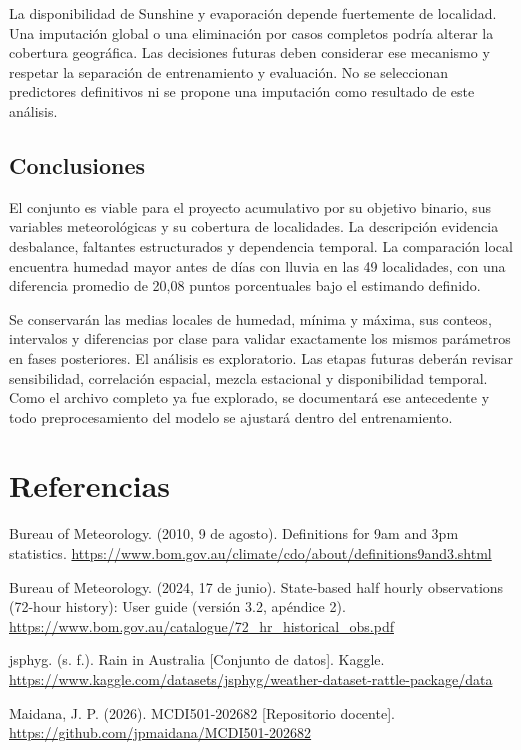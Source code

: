 \documentclass[11pt,a4paper]{article}
\begin{document}
La disponibilidad de Sunshine y evaporación depende fuertemente de localidad. Una imputación global o una eliminación por casos completos podría alterar la cobertura geográfica. Las decisiones futuras deben considerar ese mecanismo y respetar la separación de entrenamiento y evaluación. No se seleccionan predictores definitivos ni se propone una imputación como resultado de este análisis.


\subsection{Conclusiones}

El conjunto es viable para el proyecto acumulativo por su objetivo binario, sus variables meteorológicas y su cobertura de localidades. La descripción evidencia desbalance, faltantes estructurados y dependencia temporal. La comparación local encuentra humedad mayor antes de días con lluvia en las 49 localidades, con una diferencia promedio de 20,08 puntos porcentuales bajo el estimando definido.


Se conservarán las medias locales de humedad, mínima y máxima, sus conteos, intervalos y diferencias por clase para validar exactamente los mismos parámetros en fases posteriores. El análisis es exploratorio. Las etapas futuras deberán revisar sensibilidad, correlación espacial, mezcla estacional y disponibilidad temporal. Como el archivo completo ya fue explorado, se documentará ese antecedente y todo preprocesamiento del modelo se ajustará dentro del entrenamiento.


\clearpage


\section{Referencias}

Bureau of Meteorology. (2010, 9 de agosto). Definitions for 9am and 3pm statistics. \url{https://www.bom.gov.au/climate/cdo/about/definitions9and3.shtml}


Bureau of Meteorology. (2024, 17 de junio). State-based half hourly observations (72-hour history): User guide (versión 3.2, apéndice 2). \url{https://www.bom.gov.au/catalogue/72_hr_historical_obs.pdf}


jsphyg. (s. f.). Rain in Australia [Conjunto de datos]. Kaggle. \url{https://www.kaggle.com/datasets/jsphyg/weather-dataset-rattle-package/data}


Maidana, J. P. (2026). MCDI501-202682 [Repositorio docente]. \url{https://github.com/jpmaidana/MCDI501-202682}
\end{document}
